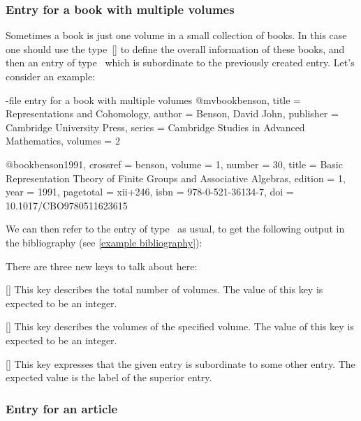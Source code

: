 \subsubsection{Entry for a book with multiple volumes}

Sometimes a book is just one volume in a small collection of books.
In this case one should use the type~[\atname] to define the overall information of these books, and then an entry of type~ which is subordinate to the previously created entry.
Let’s consider an example:
\begin{showcode}[label = {bib entry multiple volume book}]{-file entry for a book with multiple volumes}
@mvbook{benson,
  title     = {Representations and Cohomology},
  author    = {Benson, David John},
  publisher = {Cambridge University Press},
  series    = {Cambridge Studies in Advanced Mathematics},
  volumes   = {2}
}

@book{benson1991,
  crossref  = {benson},
  volume    = {1},
  number    = {30},
  title     = {Basic Representation Theory of Finite Groups and Associative Algebras},
  edition   = {1},
  year      = {1991},
  pagetotal = {xii+246},
  isbn      = {978-0-521-36134-7},
  doi       = {10.1017/CBO9780511623615}
}
\end{showcode}
We can then refer to the entry of type~ as usual, to get the following output in the bibliography (see \cref{example bibliography}):

There are three new keys to talk about here:
\begin{mydescription}
  \item[\optname{volumes}]
    [\optname]
    This key describes the total number of volumes.
    The value of this key is expected to be an integer.
  \item[\optname{volume}]
    [\optname]
    This key describes the volumes of the specified volume.
    The value of this key is expected to be an integer.
  \item[\optname{crossref}]
  [\optname]
    This key expresses that the given entry is subordinate to some other entry.
    The expected value is the label of the superior entry.
\end{mydescription}

\subsubsection{Entry for an article}

